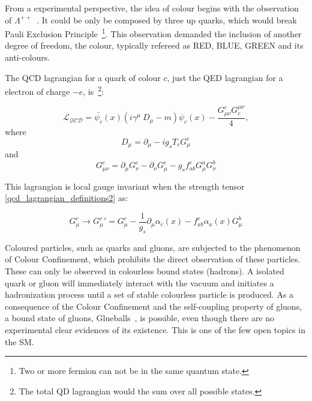 From a experimental perspective, the idea of colour begins with the observation of $\Lambda^{++}$~\cite{dalitz1967proceedings}. It could be only be composed by three up quarks, which would break Pauli Exclusion Principle~\footnote{Two or more fermion can not be in the same quantum state.}. This observation demanded the inclusion of another degree of freedom, the colour, typically refereed as RED, BLUE, GREEN and its anti-colours.

The QCD lagrangian for a quark of colour $c$, just the QED lagrangian for a electron of charge $-e$, is~\footnote{The total QD lagrangian would the sum over all possible states.}:

\begin{equation}
    \mathcal{L_{QCD}} = \bar{\psi_c}(x)(i\gamma^\mu\ D_\mu -m)\psi_c(x) - \frac{G_{\mu\nu}^c G^{\mu\nu}_c}{4},
\label{qcd_lagrangian}
\end{equation}
where
\begin{equation}
    D_\mu = \partial_\mu - ig_s T_c G_\mu^c
\label{qcd_lagrangian_definitions1}
\end{equation}
and 
\begin{equation}
    G_{\mu\nu}^c = \partial_\mu G_\nu^c - \partial_\nu G_\mu^c - g_s f_{ab}^c G_\mu^a G_\nu^b
\label{qcd_lagrangian_definitions2}
\end{equation}

This lagrangian is local gauge invariant when the strength tensor \ref{qcd_lagrangian_definitions2} as:

\begin{equation}
    G_{\mu}^c \rightarrow {G_{\mu}^c}' = G_{\mu}^c - \frac{1}{g_s} \partial_\mu \alpha_c(x) - f_{ab}^c \alpha_a(x) G_{\mu}^b
\label{strength_tensor_tranform}
\end{equation}

Coloured particles, such as quarks and gluons, are subjected to the phenomenon of Colour Confinement, which prohibits the direct observation of these particles. These can only be observed in colourless bound states (hadrons). A isolated quark or gluon will immediately interact with the vacuum and initiates a hadronization process until a set of stable colourless particle is produced. As a consequence of the Colour Confinement and the self-coupling property of gluons, a bound state of gluons, Glueballs~\cite{wolfgang_status}, is possible, even though there are no experimental clear evidences of its existence. This is one of the few open topics in the SM.

